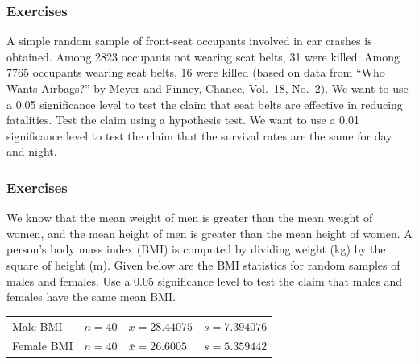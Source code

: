 \documentclass[xcolor=dvipsnames]{beamer}
\begin{document}
\begin{frame}
  \frametitle{Exercises}
{\ubung} A simple random sample of front-seat
occupants involved in car crashes is obtained. Among 2823 occupants
not wearing scat belts, 31 were killed. Among 7765 occupants wearing
seat belts, 16 were killed (based on data from ``Who Wants Airbags?'' by
Meyer and Finney, Chance, Vol.\ 18, No.\ 2). We want to use a 0.05
significance level to test the claim that seat belts are effective in
reducing fatalities. Test the claim using a hypothesis test. We want
to use a 0.01 significance level to test the claim that the survival
rates are the same for day and night.
\end{frame}




\begin{frame}
  \frametitle{Exercises}
{\ubung} We know that the mean weight of men is
greater than the mean weight of women, and the mean height of men is
greater than the mean height of women. A person's body mass index
(BMI) is computed by dividing weight (kg) by the square of height (m).
Given below are the BMI statistics for random samples of males and
females. Use a 0.05 significance level to test the claim that males
and females have the same mean BMI. 

\medskip

\begin{tabular}{llll}
  Male BMI & $n=40$ & $\bar{x}=28.44075$ & $s=7.394076$ \\ 
  Female BMI & $n=40$ & $\bar{x}=26.6005$ & $s=5.359442$ \\
\end{tabular}
\end{frame}
\end{document}
